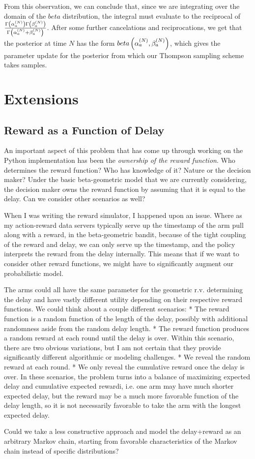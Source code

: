 \documentclass{article}
\begin{document}
From this observation, we can conclude that, since we are integrating over the domain of the $beta$ distribution, the integral must evaluate to the reciprocal of $\frac{\Gamma\left( \alpha_a^{(N)} \right)\Gamma\left( \beta_a^{(N)} \right)}{\Gamma\left( \alpha_a^{(N)} + \beta_a^{(N)} \right)}$. After some further cancelations and reciprocations, we get that the posterior at time $N$ has the form $beta\left( \alpha_a^{(N)}, \beta_a^{(N)} \right)$, which gives the parameter update for the posterior from which our Thompson sampling scheme takes samples.

\section{Extensions} \label{sec:extensions}

\subsection{Reward as a Function of Delay} \label{subsec:reward}
An important aspect of this problem that has come up through working on the Python implementation has been the \textit{ownership of the reward function}. Who determines the reward function? Who has knowledge of it? Nature or the decision maker? Under the basic beta-geometric model that we are currently considering, the decision maker owns the reward function by assuming that it is equal to the delay. Can we consider other scenarios as well?

When I was writing the reward simulator, I happened upon an issue. Where as my action-reward data servers typically serve up the timestamp of the arm pull along with a reward, in the beta-geometric bandit, because of the tight coupling of the reward and delay, we can only serve up the timestamp, and the policy interprets the reward from the delay internally. This means that if we want to consider other reward functions, we might have to significantly augment our probabilistic model. 

The arms could all have the same parameter for the geometric r.v. determining the delay and have vastly different utility depending on their respective reward functions. We could think about a couple different scenarios:
    * The reward function is a random function of the length of the delay, possibly with additional randomness aside from the random delay length.
    * The reward function produces a random reward at each round until the delay is over. Within this scenario, there are two obvious variations, but I am not certain that they provide significantly different algorithmic or modeling challenges.
        * We reveal the random reward at each round.
        * We only reveal the cumulative reward once the delay is over.
In these scenarios, the problem turns into a balance of maximizing expected delay and cumulative expected rewardi, i.e. one arm may have much shorter expected delay, but the reward may be a much more favorable function of the delay length, so it is not necessarily favorable to take the arm with the longest expected delay.

Could we take a less constructive approach and model the delay+reward as an arbitrary Markov chain, starting from favorable characteristics of the Markov chain instead of specific distributions?
\end{document}
